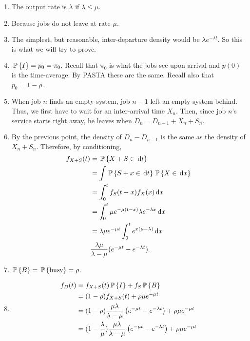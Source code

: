\begin{question}
    \begin{solution}
      \begin{enumerate}
      \item 
       The output rate is $\lambda$ if $\lambda \leq \mu$.
     \item        Because jobs do not leave at rate $\mu$. 
     \item The simplest, but reasonable, inter-departure density would be $\lambda e^{-\lambda t}$. So this is what we will try to prove.
     \item $\P I = p_0 =\pi_0$. Recall that $\pi_0$ is what
    the jobs see upon arrival and $p(0)$ is the time-average. By PASTA
    these are the same.  Recall also that $p_0 = 1-\rho$.
  \item  When job $n$ finds an empty system, job $n-1$ left an empty
    system behind. Thus, we first have to wait for an inter-arrival
    time $X_n$. Then, since job $n$'s service starts right away, he
    leaves when $D_n = D_{n-1}+X_n + S_n$.
  \item       By the previous point, the density of $D_{n} - D_{n-1}$ is the
      same as the density of $X_n + S_n$. Therefore, by conditioning,
    \begin{equation*}
      \begin{split}
    f_{X+S}(t) 
&= \P{X+S\in \d{t}} \\
&= \int \P{S+x\in \d{t}}\P{X\in \d{x}} \\
&=\int_0^t f_S(t-x) f_X(x) \d{x} \\
     &= \int_0^t \mu e^{-\mu(t-x)} \lambda e^{-\lambda x} \d{x} \\
     &= \lambda \mu e^{-\mu t} \int_0^t  e^{x(\mu-\lambda)} \d{x} \\
& \frac{\lambda \mu}{\lambda - \mu} (e^{-\mu t} - e^{-\lambda t}).
      \end{split}
    \end{equation*}
  \item        $\P B = \P{\text{busy}}=\rho$.
  \item       \begin{equation*}
        \begin{split}
    f_D(t) 
&= f_{X+S}(t) \P I + f_S \P B \\
&= (1-\rho) f_{X+S}(t) +    \rho \mu e^{-\mu t} \\
&= (1-\rho) \frac{\mu\lambda}{\lambda-\mu} \left(e^{-\mu t}-e^{-\lambda t}\right) +    \rho \mu e^{-\mu t} \\
&= (1-\frac{\lambda}\mu) \frac{\mu\lambda}{\lambda-\mu}\left(e^{-\mu t}-e^{-\lambda t}\right)  +    \rho \mu e^{-\mu t} \\

\end{split}
\end{equation*}
\end{enumerate}
\end{solution}
\end{question}
